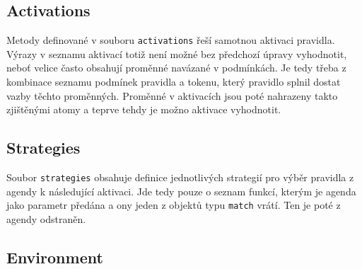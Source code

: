 \subsection{Activations}
Metody definované v souboru \verb|activations| řeší samotnou aktivaci pravidla.
Výrazy v seznamu aktivací totiž není možné bez předchozí úpravy vyhodnotit,
neboť velice často obsahují proměnné navázané v podmínkách. Je tedy třeba
z kombinace seznamu podmínek pravidla a tokenu, který pravidlo splnil dostat
vazby těchto proměnných. Proměnné v aktivacích jsou poté nahrazeny takto
zjištěnými atomy a teprve tehdy je možno aktivace vyhodnotit.
\subsection{Strategies}
Soubor \verb|strategies| obsahuje definice jednotlivých strategií pro výběr
pravidla z agendy k následující aktivaci. Jde tedy pouze o seznam funkcí,
kterým je agenda jako parametr předána a ony jeden z objektů typu \verb|match|
vrátí. Ten je poté z agendy odstraněn.
\subsection{Environment}

